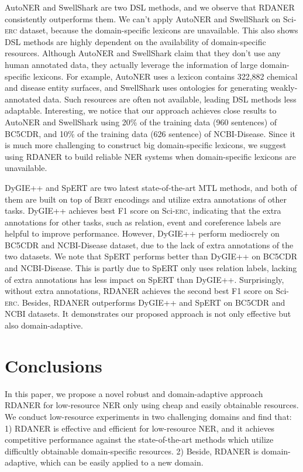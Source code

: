 \documentclass[10pt, conference, compsocconf]{IEEEtran}
\newcommand{\bert}{\textsc{Bert}\xspace}
\newcommand{\Scierc}{\textsc{S}ci-\textsc{erc}\xspace}
\newcommand{\rdaner}{\textsc{RDANER}\xspace}
\begin{document}
AutoNER and SwellShark are two DSL methods, and we observe that \rdaner consistently outperforms them.
We can't apply AutoNER and SwellShark on \Scierc dataset, because the domain-specific lexicons are unavailable.  
This also shows DSL methods are highly dependent on the availability of domain-specific resources. 
Although AutoNER and SwellShark claim that they don't use any human annotated data, they actually leverage the information of 
large domain-specific lexicons. For example, AutoNER uses a lexicon contains 322,882 chemical 
and disease entity surfaces, and SwellShark uses ontologies for generating weakly-annotated data. Such resources are often
not available, leading DSL methods less adaptable.
Interesting, we notice that our approach achieves close results to AutoNER and SwellShark using
20\% of the training data (960 sentences) of BC5CDR, and 10\% of the training data (626 sentence) of NCBI-Disease.
Since it is much more challenging to construct big domain-specific lexicons, 
we suggest using \rdaner to build reliable NER systems when domain-specific lexicons are unavailable.

DyGIE++ and SpERT are two latest state-of-the-art MTL methods,
and both of them are built on top of \bert encodings and utilize extra annotations of other tasks. 
DyGIE++ achieves best F1 score on \Scierc, indicating 
that the extra annotations for other tasks, such as relation, event and coreference labels
are helpful to improve performance. 
However, DyGIE++ perform mediocrely on BC5CDR and 
NCBI-Disease dataset, due to the lack of extra annotations of the two datasets.
We note that SpERT performs better than DyGIE++ on BC5CDR and NCBI-Disease.
This is partly due to SpERT only uses relation labels, lacking of extra annotations has
less impact on SpERT than DyGIE++. 
Surprisingly, without extra annotations, \rdaner achieves the second best F1 score on \Scierc.
Besides, \rdaner outperforms DyGIE++ and SpERT on BC5CDR and NCBI datasets.
It demonstrates our proposed approach is not only effective but also domain-adaptive.




\section{Conclusions}
In this paper, we propose a novel robust and domain-adaptive approach \rdaner for low-resource
NER only using cheap and easily obtainable resources. 
We conduct low-resource experiments in two challenging domains and find that:
1) \rdaner is effective and efficient for low-resource NER, 
and it achieves competitive performance against the state-of-the-art methods which utilize
difficultly obtainable domain-specific resources.
2) Beside, \rdaner is domain-adaptive,  which can be easily applied to a new domain.
\end{document}
